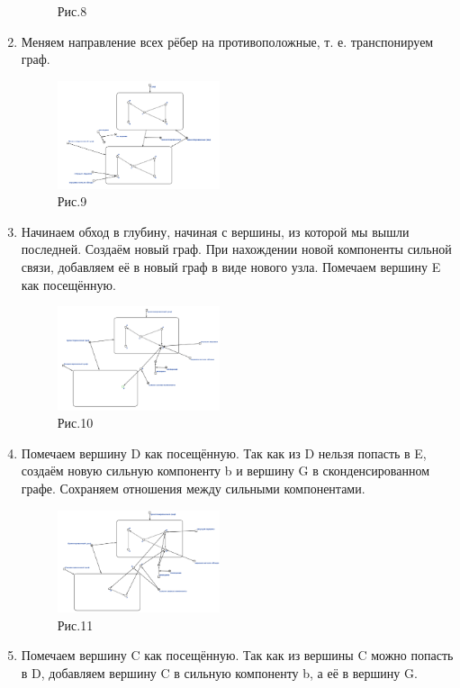 \documentclass[10pt,a4paper,twocolumn]{article}
\begin{document}
\begin{enumerate}
\begin{figure}[h]
		\caption{Рис.8}
	\end{figure}
    \newpage
	\item Меняем направление всех рёбер на противоположные, т. е. транспонируем граф.
	\begin{figure}[h]
		\includegraphics[width=0.45\textwidth]{img/9.png}
		\caption{Рис.9}
	\end{figure}
	\item Начинаем обход в глубину, начиная с вершины, из которой мы вышли последней. Создаём новый граф. При нахождении новой компоненты сильной связи, добавляем её в новый граф в виде нового узла. Помечаем вершину E как посещённую.
	\begin{figure}[h]
		\includegraphics[width=0.45\textwidth]{img/10.png}
		\caption{Рис.10}
	\end{figure}
	\item Помечаем вершину D как посещённую. Так как из D нельзя попасть в E, создаём новую сильную компоненту b и  вершину G в сконденсированном графе. Сохраняем отношения между сильными компонентами.
	\begin{figure}[h]
		\includegraphics[width=0.45\textwidth]{img/11.png}
		\caption{Рис.11}
	\end{figure}
    \newpage
	\item Помечаем вершину C как посещённую. Так как из вершины C можно попасть в D, добавляем вершину C в сильную компоненту b, а её в вершину G.

\end{enumerate}
\end{document}
